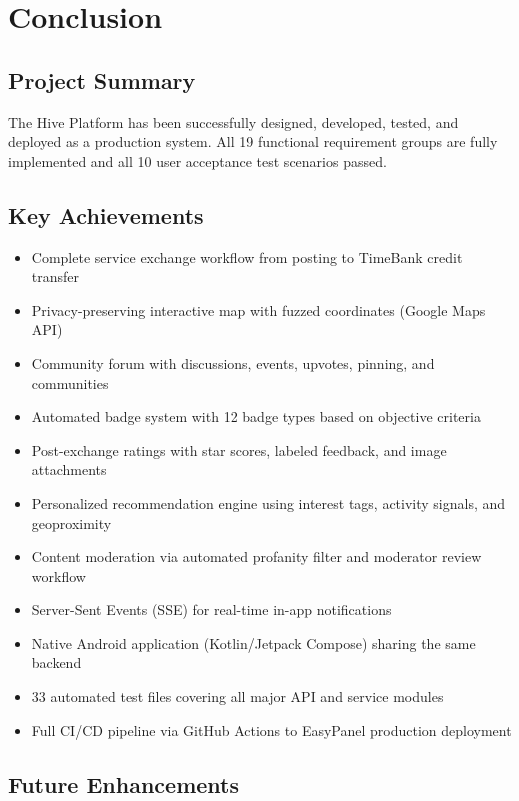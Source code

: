 \documentclass[11pt,a4paper]{report}
\begin{document}
\chapter{Conclusion}

\section{Project Summary}

The Hive Platform has been successfully designed, developed, tested, and deployed as a production system. All 19 functional requirement groups are fully implemented and all 10 user acceptance test scenarios passed.

\section{Key Achievements}

\begin{itemize}
    \item Complete service exchange workflow from posting to TimeBank credit transfer
    \item Privacy-preserving interactive map with fuzzed coordinates (Google Maps API)
    \item Community forum with discussions, events, upvotes, pinning, and communities
    \item Automated badge system with 12 badge types based on objective criteria
    \item Post-exchange ratings with star scores, labeled feedback, and image attachments
    \item Personalized recommendation engine using interest tags, activity signals, and geoproximity
    \item Content moderation via automated profanity filter and moderator review workflow
    \item Server-Sent Events (SSE) for real-time in-app notifications
    \item Native Android application (Kotlin/Jetpack Compose) sharing the same backend
    \item 33 automated test files covering all major API and service modules
    \item Full CI/CD pipeline via GitHub Actions to EasyPanel production deployment
\end{itemize}

\section{Future Enhancements}
\end{document}
